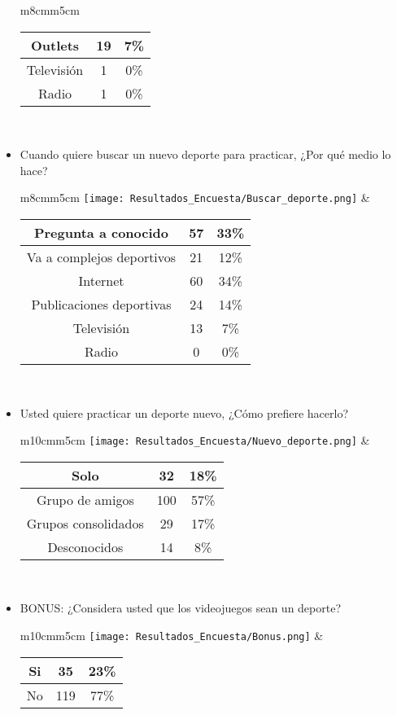 \begin{itemize}
\begin{tabular}{m{8cm}m{5cm}}
\begin{tabular}{|c|cc|}
         Outlets & 19 & 7\% \\ \hline
         Televisión & 1 & 0\% \\ \hline
         Radio & 1 & 0\% \\ \hline
        \end{tabular} \\
      \end{tabular}
      \newpage
  \item Cuando quiere buscar un nuevo deporte para practicar, ¿Por qué medio lo hace? \\
      \begin{tabular}{m{8cm}m{5cm}}
        \texttt{[image: Resultados\_Encuesta/Buscar\_deporte.png]} &
        \begin{tabular}{|c|cc|}
        \hline
         Pregunta a conocido & 57 & 33\% \\ \hline
         Va a complejos deportivos & 21 & 12\% \\ \hline
         Internet & 60 & 34\% \\ \hline
         Publicaciones deportivas & 24 & 14\% \\ \hline
         Televisión & 13 & 7\% \\ \hline
         Radio & 0 & 0\% \\ \hline
        \end{tabular} \\
      \end{tabular}
  \item Usted quiere practicar un deporte nuevo, ¿Cómo prefiere hacerlo? \\
      \begin{tabular}{m{10cm}m{5cm}}
        \texttt{[image: Resultados\_Encuesta/Nuevo\_deporte.png]} &
        \begin{tabular}{|c|cc|}
        \hline
         Solo & 32 & 18\% \\ \hline
         Grupo de amigos & 100 & 57\% \\ \hline
         Grupos consolidados & 29 & 17\% \\ \hline
         Desconocidos & 14 & 8\% \\ \hline
        \end{tabular} \\
      \end{tabular}
  \item BONUS: ¿Considera usted que los videojuegos sean un deporte? \\
      \begin{tabular}{m{10cm}m{5cm}}
        \texttt{[image: Resultados\_Encuesta/Bonus.png]} &
        \begin{tabular}{|c|cc|}
        \hline
         Si & 35 & 23\% \\ \hline
         No & 119 & 77\% \\ \hline
        \end{tabular} \\
      \end{tabular}
\end{itemize}
